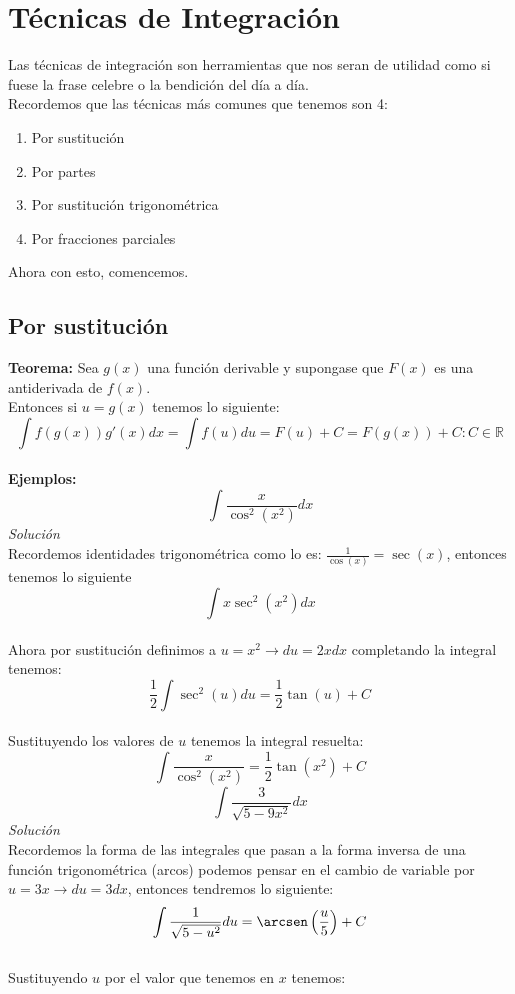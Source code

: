 \documentclass[10pt]{article}
\begin{document}
\section{Técnicas de Integración}
Las técnicas de integración son herramientas que nos seran de utilidad como si fuese la frase celebre o la bendición del día a día.\\
Recordemos que las técnicas más comunes que tenemos son 4:
\begin{enumerate}
  \item Por sustitución
  \item Por partes
  \item Por sustitución trigonométrica
  \item Por fracciones parciales
\end{enumerate}
Ahora con esto, comencemos.
\subsection{Por sustitución}
\textbf{Teorema:} Sea $g(x)$ una función derivable y supongase que $F(x)$ es una antiderivada de $f(x)$.\\
Entonces si $u=g(x)$ tenemos lo siguiente:\\
\[\int f(g(x))g'(x)dx = \int f(u)du = F(u) + C = F(g(x)) + C   \colon C \in \mathbb{R}\]
\\
\textbf{Ejemplos:}
\\
\[\int \frac{x}{\cos^{2}(x^{2})}dx\]
\textit{Solución}\\
Recordemos identidades trigonométrica como lo es: $\frac{1}{\cos(x)}=\sec(x)$, entonces tenemos lo siguiente
\[\int x \sec^{2}(x^2)dx\]\\
Ahora por sustitución definimos a $u=x^{2} \rightarrow du=2x dx$ completando la integral tenemos:
\[\frac{1}{2}\int \sec^{2}(u)du = \frac{1}{2}\tan(u) + C\]\\
Sustituyendo los valores de $u$ tenemos la integral resuelta:
\[\int \frac{x}{\cos^{2}(x^{2})} = \frac{1}{2} \tan(x^{2}) + C \]
\vspace{1.5cm}
\[\int \frac{3}{\sqrt{5-9x^{2}}}dx\]
\textit{Solución}\\
Recordemos la forma de las integrales que pasan a la forma inversa de una función trigonométrica (arcos) podemos pensar en el cambio de variable por $u=3x \rightarrow du=3dx$, entonces tendremos lo siguiente:\\
\[\int \frac{1}{\sqrt{5-u^{2}}}du = \arcsen\left(\frac{u}{5}\right) + C\]\\
Sustituyendo $u$ por el valor que tenemos en $x$ tenemos:\\
\end{document}
